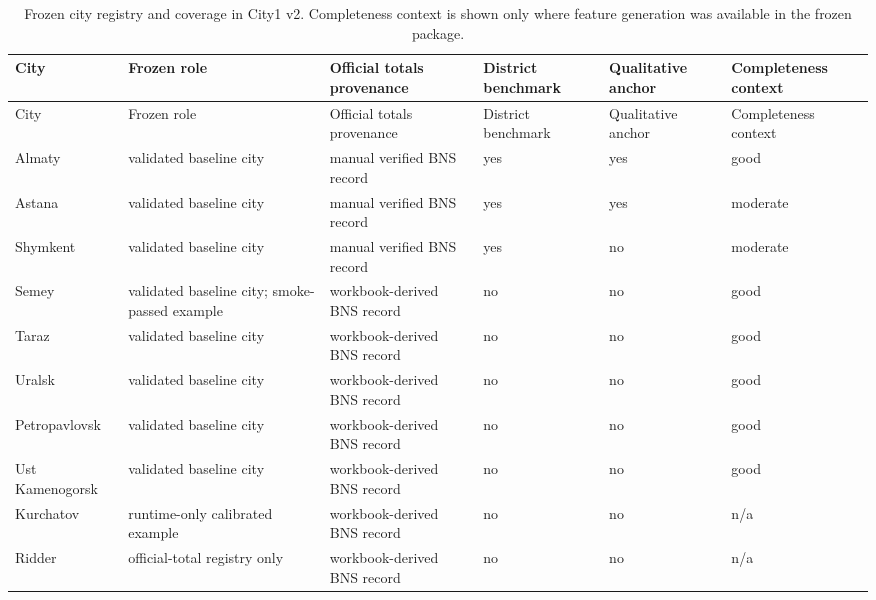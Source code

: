 \begingroup
\small
\setlength{\LTleft}{0pt}
\setlength{\LTright}{0pt}
\begin{longtable}{L{0.14\textwidth} L{0.20\textwidth} L{0.20\textwidth} L{0.12\textwidth} L{0.12\textwidth} L{0.12\textwidth}}
\caption{Frozen city registry and coverage in City1 v2. Completeness context is shown only where feature generation was available in the frozen package.}\label{tab:s2_registry}\\
\toprule
City & Frozen role & Official totals provenance & District benchmark & Qualitative anchor & Completeness context \\
\midrule
\endfirsthead
\toprule
City & Frozen role & Official totals provenance & District benchmark & Qualitative anchor & Completeness context \\
\midrule
\endhead
\bottomrule
\endfoot
Almaty & validated baseline city & manual verified BNS record & yes & yes & good \\
Astana & validated baseline city & manual verified BNS record & yes & yes & moderate \\
Shymkent & validated baseline city & manual verified BNS record & yes & no & moderate \\
Semey & validated baseline city; smoke-passed example & workbook-derived BNS record & no & no & good \\
Taraz & validated baseline city & workbook-derived BNS record & no & no & good \\
Uralsk & validated baseline city & workbook-derived BNS record & no & no & good \\
Petropavlovsk & validated baseline city & workbook-derived BNS record & no & no & good \\
Ust Kamenogorsk & validated baseline city & workbook-derived BNS record & no & no & good \\
Kurchatov & runtime-only calibrated example & workbook-derived BNS record & no & no & n/a \\
Ridder & official-total registry only & workbook-derived BNS record & no & no & n/a \\
\end{longtable}
\endgroup

